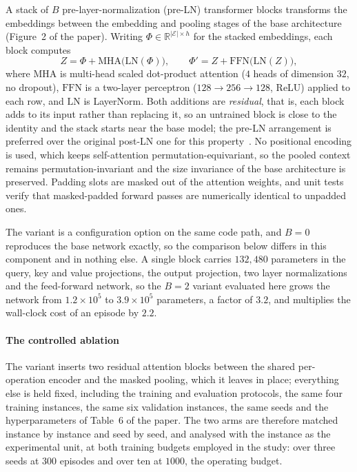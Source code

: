 \documentclass[preprint,authoryear,12pt]{elsarticle}
\begin{document}
A stack of $B$ pre-layer-normalization (pre-LN) transformer blocks
transforms the embeddings between the embedding and pooling stages of
the base architecture (Figure~2 of the paper). Writing
$\Phi\in\mathbb{R}^{|\mathcal{E}|\times h}$ for the stacked
embeddings, each block computes
\begin{equation}
\label{sup:eq-attnblock}
Z=\Phi+\mathrm{MHA}\big(\mathrm{LN}(\Phi)\big),\qquad
\Phi'=Z+\mathrm{FFN}\big(\mathrm{LN}(Z)\big),
\end{equation}
where $\mathrm{MHA}$ is multi-head scaled dot-product attention ($4$
heads of dimension $32$, no dropout), $\mathrm{FFN}$ is a two-layer
perceptron ($128\to256\to128$, ReLU) applied to each row, and
$\mathrm{LN}$ is LayerNorm. Both additions are \emph{residual}, that
is, each block adds to its input rather than replacing it, so an
untrained block is close to the identity and the stack starts near
the base model; the pre-LN arrangement is preferred over the original
post-LN one for this property~\citep{Xiong2020}. No positional
encoding is used, which keeps self-attention
permutation-equivariant, so the pooled context remains
permutation-invariant and the size invariance of the base
architecture is preserved. Padding slots are masked out of the
attention weights, and unit tests verify that masked-padded forward
passes are numerically identical to unpadded ones.

The variant is a configuration option on the same code path, and
$B{=}0$ reproduces the base network exactly, so the comparison below
differs in this component and in nothing else. A single block carries
$132{,}480$ parameters in the query, key and value projections, the
output projection, two layer normalizations and the feed-forward
network, so the $B{=}2$ variant evaluated here grows the network from
$1.2\times10^{5}$ to $3.9\times10^{5}$ parameters, a factor of
$3.2$, and multiplies the wall-clock cost of an episode by $2.2$.

\paragraph{The controlled ablation} The variant inserts two residual
attention blocks between the shared per-operation encoder and the
masked pooling, which it leaves in place; everything else is held
fixed, including the training and evaluation protocols, the same four
training instances, the same six validation instances, the same seeds
and the hyperparameters of Table~6 of the paper. The two arms are
therefore matched instance by instance and seed by seed, and analysed
with the instance as the experimental unit, at both training budgets
employed in the study: over three seeds at $300$ episodes and over
ten at $1000$, the operating budget.
\end{document}
